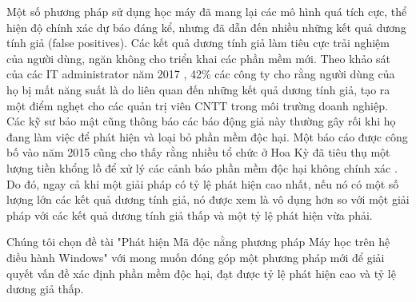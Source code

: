 Một số phương pháp sử dụng học máy đã mang lại các mô hình quá tích cực, thể hiện độ chính xác dự báo đáng kể, nhưng đã dẫn đến nhiều những kết quả dương tính giả (false positives). Các kết quả dương tính giả làm tiêu cực trải nghiệm của người dùng, ngăn không cho triển khai các phần mềm mới. Theo khảo sát của các IT administrator năm 2017 \cite{jonathan2017survey}, 42\% các công ty cho rằng người dùng của họ bị mất năng suất là do liên quan đến những kết quả dương tính giả, tạo ra một điểm nghẹt cho các quản trị viên CNTT trong môi trường doanh nghiệp. Các kỹ sư bảo mật cũng thông báo các báo động giả này thường gây rối khi họ đang làm việc để phát hiện và loại bỏ phần mềm độc hại.
Một báo cáo được công bố vào năm 2015 cũng cho thấy rằng nhiều tổ chức ở Hoa Kỳ đã tiêu thụ một lượng tiền khổng lồ để xử lý các cảnh báo phần mềm độc hại không chính xác \cite{eduard2015false}. Do đó, ngay cả khi một giải pháp có tỷ lệ phát hiện cao nhất, nếu nó có một số lượng lớn các kết quả dương tính giả, nó được xem là vô dụng hơn so với một giải pháp với các kết quả dương tính giả thấp và một tỷ lệ phát hiện vừa phải.

Chúng tôi chọn đề tài "Phát hiện Mã độc nằng phương pháp Máy học trên hệ điều hành Windows" với mong muốn đóng góp một phương pháp mới để giải quyết vấn đề xác định phần mềm độc hại, đạt được tỷ lệ phát hiện cao và tỷ lệ dương giả thấp.
